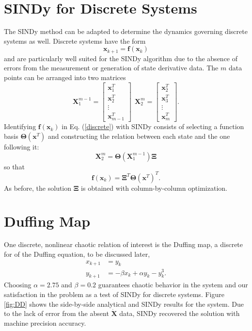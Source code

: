 \documentclass[%
 aip,12pt,
rsi,%
 amsmath,amssymb,
 reprint,%
]{revtex4-1}
\newcommand{\refe}[1]{Eq. (\ref{#1})}
\begin{document}
{\section{SINDy for Discrete Systems}
The SINDy method can be adapted to determine the dynamics governing discrete systems as well. Discrete systems have the form 
\begin{equation} \label{discrete}
  \bm{x}_{k+1} = \bm{f}(\bm{x}_k)
\end{equation}
and are particularly well suited for the SINDy algorithm due to the absence of errors from the measurement or generation of state derivative data. The $m$ data points can be arranged into two matrices
\begin{equation}
  \bm{X}_1^{m-1} = 
    \begin{bmatrix}
      \bm{x}_1^T \\ \bm{x}_2^T \\ \vdots \\ \bm{x}_{m-1}^T
    \end{bmatrix} \ \ 
  \bm{X}_2^{m} = 
    \begin{bmatrix}
      \bm{x}_2^T \\ \bm{x}_3^T \\ \vdots \\ \bm{x}_{m}^T
    \end{bmatrix}.
\end{equation}
Identifying $\bm{f}(\bm{x}_k)$ in \refe{discrete} with SINDy consists of selecting a function basis $\bm{\Theta}(\bm{x}^T)$ and constructing the relation between each state and the one following it:
\begin{equation}
  \bm{X}_2^m = \bm{\Theta}(\bm{X}_1^{m-1})\bm{\Xi}
\end{equation}
so that 
\begin{equation}
  \bm{f}(\bm{x}_k) = \bm{\Xi}^T \bm{\Theta}(\bm{x}^T)^T.
\end{equation}
As before, the solution $\bm{\Xi}$  is obtained with column-by-column optimization.

\section{Duffing Map}


One discrete, nonlinear chaotic relation of interest is the Duffing map, a discrete for of the Duffing equation, to be discussed later,
\begin{align}
  x_{k+1} &= y_k \\ 
  y_{k+1} &= -\beta x_k + \alpha y_k - y_k^3.
\end{align}
Choosing $\alpha = 2.75$ and $\beta=0.2$ guarantees chaotic behavior in the system and our satisfaction in the problem as a test of SINDy for discrete systems. Figure \ref{fig:DD} shows the side-by-side analytical and SINDy results for the system. Due to the lack of error from the absent $\bm{\dot{X}}$ data, SINDy recovered the solution with machine precision accuracy.


}
\end{document}
